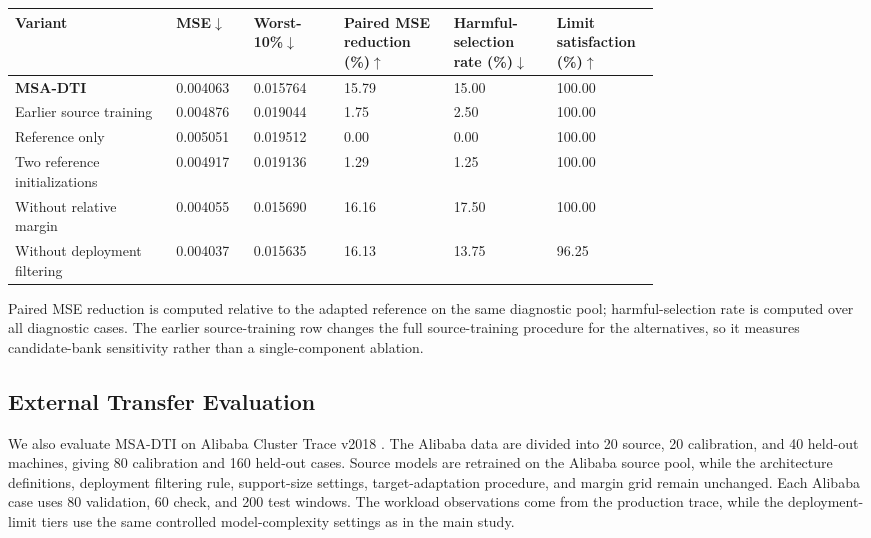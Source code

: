 \documentclass[a4paper,fleqn]{cas-sc}
\begin{document}
\begin{center}
\begin{minipage}{\linewidth}
\label{tab:component}
\centering
\scriptsize
\renewcommand{\arraystretch}{1.08}
\setlength{\tabcolsep}{2.2pt}
\begin{tabularx}{\linewidth}
{Y Z{0.12\linewidth} Z{0.14\linewidth} Z{0.17\linewidth} Z{0.16\linewidth} Z{0.16\linewidth}}
\toprule
Variant
& MSE$\downarrow$
& Worst-10\%$\downarrow$
& Paired MSE reduction (\%)$\uparrow$
& Harmful-selection rate (\%)$\downarrow$
& Limit satisfaction (\%)$\uparrow$ \\
\midrule
\textbf{MSA-DTI} & 0.004063 & 0.015764 & 15.79 & 15.00 & 100.00 \\
Earlier source training & 0.004876 & 0.019044 & 1.75 & 2.50 & 100.00 \\
Reference only & 0.005051 & 0.019512 & 0.00 & 0.00 & 100.00 \\
Two reference initializations & 0.004917 & 0.019136 & 1.29 & 1.25 & 100.00 \\
Without relative margin & 0.004055 & 0.015690 & 16.16 & 17.50 & 100.00 \\
Without deployment filtering & 0.004037 & 0.015635 & 16.13 & 13.75 & 96.25 \\
\bottomrule
\end{tabularx}
\vspace{2pt}
\par\footnotesize
Paired MSE reduction is computed relative to the adapted reference on the same
diagnostic pool; harmful-selection rate is computed over all diagnostic
cases. The earlier source-training row changes the full source-training
procedure for the alternatives, so it measures candidate-bank sensitivity
rather than a single-component ablation.
\end{minipage}
\end{center}

\subsection{External Transfer Evaluation}
\label{subsec:external}

We also evaluate MSA-DTI on Alibaba Cluster Trace v2018 \cite{ref29}. The
Alibaba data are divided into 20 source, 20 calibration, and 40 held-out
machines, giving 80 calibration and 160 held-out cases. Source models are
retrained on the Alibaba source pool, while the architecture definitions,
deployment filtering rule, support-size settings, target-adaptation procedure,
and margin grid remain unchanged. Each Alibaba case uses 80 validation, 60
check, and 200 test windows. The workload observations come from the
production trace, while the deployment-limit tiers use the same controlled
model-complexity settings as in the main study.
\end{document}
